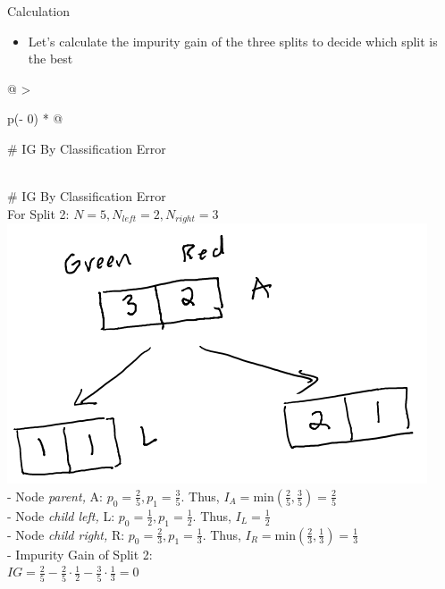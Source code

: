 \documentclass[
  ignorenonframetext,
]{beamer}
\providecommand{\tightlist}{%
  \setlength{\itemsep}{0pt}\setlength{\parskip}{0pt}}
\begin{document}
\begin{frame}{Calculation}
\protect\hypertarget{calculation}{}
\begin{itemize}
\tightlist
\item
  Let's calculate the impurity gain of the three splits to decide which
  split is the best
\end{itemize}

\begin{longtable}[]{@{}
  >{\raggedright\arraybackslash}p{(\columnwidth - 0\tabcolsep) * }@{}}
\toprule
\begin{minipage}[b]{\linewidth}\raggedright
\# IG By Classification Error
\end{minipage} \\
\midrule
\endhead
\# IG By Classification Error \\
For Split 2: \(N = 5, N_{left} =2, N_{right} = 3\) \\
\includegraphics{images/im3.png} \\
- Node \emph{parent,} A: \(p_0 = \frac{2}{5}, p_1 = \frac{3}{5}\). Thus,
\(I_{A} = \text{min}(\frac{2}{5}, \frac{3}{5}) = \frac{2}{5}\) \\
- Node \emph{child left,} L: \(p_0 = \frac{1}{2}, p_1 = \frac{1}{2}\).
Thus, \(I_{L} = \frac{1}{2}\) \\
- Node \emph{child right,} R: \(p_0 = \frac{2}{3}, p_1 = \frac{1}{3}\).
Thus, \(I_{R} = \text{min}(\frac{2}{3}, \frac{1}{3}) = \frac{1}{3}\) \\
- Impurity Gain of Split 2: \\
\(IG = \frac{2}{5} - \frac{2}{5} \cdot \frac{1}{2}-\frac{3}{5} \cdot \frac{1}{3} = 0\) \\
\bottomrule
\end{longtable}
\end{frame}
\end{document}
